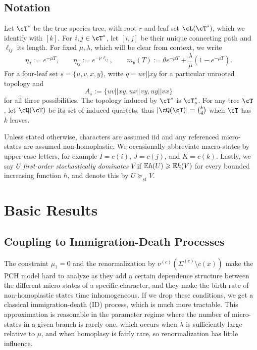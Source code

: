 \subsection{Notation}

Let $\cT^*$ be the true species tree, with root $r$ and leaf set $\cL(\cT^*)$,
which we identify with $[k]$. For $i,j\in\cT^*$, let $[i,j]$ be their unique
connecting path and $\ell_{ij}$ its length. For fixed $\mu, \lambda$, which
will be clear from context, we write
%
\[\eta_T:=e^{-\mu T},\qquad \eta_{ij}:=e^{-\mu\ell_{ij}},\qquad
m_\theta(T):=\theta e^{-\mu T}+\frac{\lambda}{\mu}(1-e^{-\mu T}).\]
%
For a four-leaf set $s=\{u,v,x,y\}$, write $q=uv||xy$ for a particular
unrooted topology and
%
\[A_s:=\{uv||xy,ux||vy,uy||vx\}\]
%
for all three possibilities. The topology induced by $\cT^*$ is $\cT_s^*$.
For any tree $\cT$, let $\cQ(\cT)$ be its set of induced quartets; thus
$|\cQ(\cT)|={k\choose4}$ when $\cT$ has $k$ leaves.

Unless stated otherwise, characters are assumed iid and any referenced micro-states are assumed
non-homoplastic. We occasionally abbreviate macro-states by upper-case letters,
for example $I=c(i)$, $J=c(j)$, and $K=c(k)$. Lastly, we say $U$ \emph{first-order stochastically
dominates} $V$ if $\mathbb{E} h(U)\geqslant\mathbb{E} h(V)$ for every bounded increasing function $h$, and
denote this by $U\succeq_{st}V$.

\section{Basic Results}
\label{sec:basic_results}

\subsection{Coupling to Immigration-Death Processes}

The constraint $\mu_1 = 0$ and the renormalization by $\nu^{(c)} (\Sigma^{(c)} \setminus c(x))$ make 
the PCH model hard to analyze as they add a certain
dependence structure between the different micro-states of a specific character, and they make
the birth-rate of non-homoplastic states time inhomogeneous. If we drop these conditions, we
get a classical immigration-death (ID) process, which is much more tractable. This approximation
is reasonable in the parameter regime where the number of micro-states in a given branch is rarely one, which occurs
when $\lambda$ is sufficiently large relative to $\mu$, and when homoplasy is fairly rare, so renormalization has little
influence.

